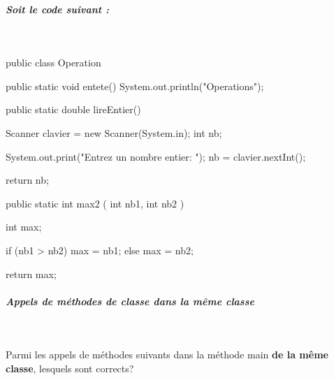 \documentclass[11pt,a4paper]{article}
\begin{document}
		\subparagraph{Soit le code suivant :  } 
		
					\textcolor{white}{.} \par
				\begin{Java}
public class Operation {

	public static void entete() {
		System.out.println("Operations");
	}
  
	public static double lireEntier() {  
	
		Scanner clavier = new Scanner(System.in);
		int nb;
		
		System.out.print("Entrez un nombre entier: ");
		nb = clavier.nextInt();
		
		return nb;  
	}  
	
	public static int max2 ( int nb1, int nb2 ) { 
	 
		int max;
		
		if (nb1 > nb2) {
			max = nb1;
		} else {
			max = nb2;
		}
		
		return max;  
	}   
	 
}				\end{Java}
            \par
        
			
		\subparagraph{Appels de m\'ethodes de classe dans la m\^eme classe} 
		
                \textcolor{white}{.} \par
            
              Parmi les appels de m\'ethodes suivants dans la m\'ethode main \textbf{de la m\^eme classe},  lesquels sont corrects?  
            
\end{document}
